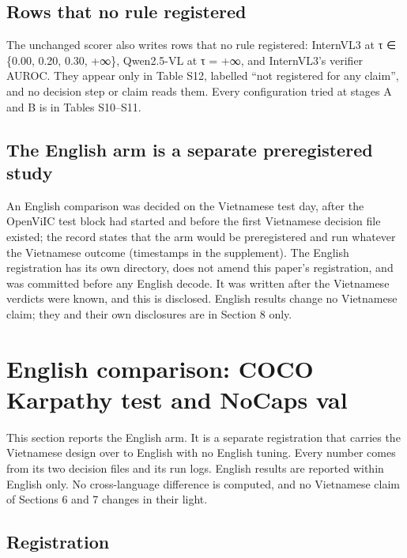 \documentclass[manuscript,screen]{acmart}
\begin{document}
\subsection{Rows that no rule registered}\label{rows-that-no-rule-registered}

The unchanged scorer also writes rows that no rule registered: InternVL3 at τ ∈ \{0.00, 0.20, 0.30,
+∞\}, Qwen2.5-VL at τ = +∞, and InternVL3's verifier AUROC. They appear only in Table S12, labelled
``not registered for any claim'', and no decision step or claim reads them. Every configuration
tried at stages A and B is in Tables S10--S11.

\subsection{The English arm is a separate preregistered
study}\label{the-english-arm-is-a-separate-preregistered-study}

An English comparison was decided on the Vietnamese test day, after the OpenViIC test block had
started and before the first Vietnamese decision file existed; the record states that the arm would
be preregistered and run whatever the Vietnamese outcome (timestamps in the supplement). The English
registration has its own directory, does not amend this paper's registration, and was committed
before any English decode. It was written after the Vietnamese verdicts were known, and this is
disclosed. English results change no Vietnamese claim; they and their own disclosures are in Section
8 only.

\section{English comparison: COCO Karpathy test and NoCaps
val}\label{english-comparison-coco-karpathy-test-and-nocaps-val}

This section reports the English arm. It is a separate registration that carries the Vietnamese
design over to English with no English tuning. Every number comes from its two decision files and
its run logs. English results are reported within English only. No cross-language difference is
computed, and no Vietnamese claim of Sections 6 and 7 changes in their light.

\subsection{Registration}\label{registration}
\end{document}
